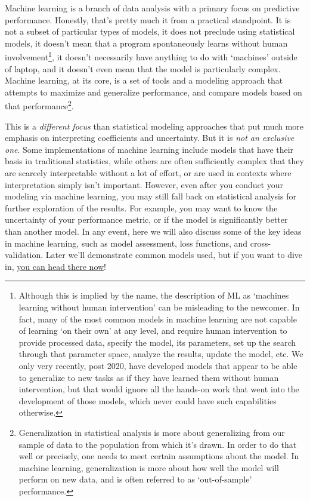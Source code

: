 \documentclass[
  letterpaper,
]{krantz}
\begin{document}
Machine learning is a branch of data analysis with a primary focus on
predictive performance. Honestly, that's pretty much it from a practical
standpoint. It is not a subset of particular types of models, it does
not preclude using statistical models, it doesn't mean that a program
spontaneously learns without human involvement\footnote{Although this is
  implied by the name, the description of ML as `machines learning
  without human intervention' can be misleading to the newcomer. In
  fact, many of the most common models in machine learning are not
  capable of learning `on their own' at any level, and require human
  intervention to provide processed data, specify the model, its
  parameters, set up the search through that parameter space, analyze
  the results, update the model, etc. We only very recently, post 2020,
  have developed models that appear to be able to generalize to new
  tasks as if they have learned them without human intervention, but
  that would ignore all the hands-on work that went into the development
  of those models, which never could have such capabilities otherwise.},
it doesn't necessarily have anything to do with `machines' outside of
laptop, and it doesn't even mean that the model is particularly complex.
Machine learning, at its core, is a set of tools and a modeling approach
that attempts to maximize and generalize performance, and compare models
based on that performance\footnote{Generalization in statistical
  analysis is more about generalizing from our sample of data to the
  population from which it's drawn. In order to do that well or
  precisely, one needs to meet certain assumptions about the model. In
  machine learning, generalization is more about how well the model will
  perform on new data, and is often referred to as `out-of-sample'
  performance.}.

This is a \emph{different focus} than statistical modeling approaches
that put much more emphasis on interpreting coefficients and
uncertainty. But it is \emph{not an exclusive one}. Some implementations
of machine learning include models that have their basis in traditional
statistics, while others are often sufficiently complex that they are
scarcely interpretable without a lot of effort, or are used in contexts
where interpretation simply isn't important. However, even after you
conduct your modeling via machine learning, you may still fall back on
statistical analysis for further exploration of the results. For
example, you may want to know the uncertainty of your performance
metric, or if the model is significantly better than another model. In
any event, here we will also discuss some of the key ideas in machine
learning, such as model assessment, loss functions, and
cross-validation. Later we'll demonstrate common models used, but if you
want to dive in, \hyperref[common-models]{you can head there now}!
\end{document}
